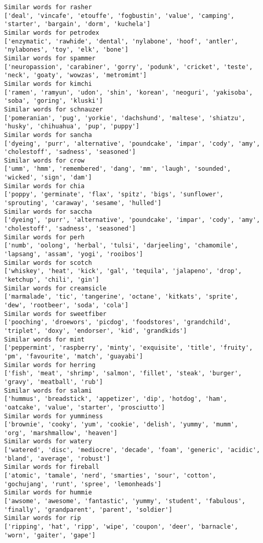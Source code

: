 \documentclass[11pt]{article}
\begin{document}
\begin{Verbatim}[commandchars=\\\{\}]
Similar words for rasher
['deal', 'vincafe', 'etouffe', 'fogbustin', 'value', 'camping', 'starter', 'bargain', 'dorm', 'kuchela']
Similar words for petrodex
['enzymatic', 'rawhide', 'dental', 'nylabone', 'hoof', 'antler', 'nylabones', 'toy', 'elk', 'bone']
Similar words for spammer
['neuropassion', 'carabiner', 'gorry', 'podunk', 'cricket', 'teste', 'neck', 'goaty', 'wowzas', 'metromimt']
Similar words for kimchi
['ramen', 'ramyun', 'udon', 'shin', 'korean', 'neoguri', 'yakisoba', 'soba', 'goring', 'kluski']
Similar words for schnauzer
['pomeranian', 'pug', 'yorkie', 'dachshund', 'maltese', 'shiatzu', 'husky', 'chihuahua', 'pup', 'puppy']
Similar words for sancha
['dyeing', 'purr', 'alternative', 'poundcake', 'impar', 'cody', 'amy', 'cholestoff', 'sadness', 'seasoned']
Similar words for crow
['umm', 'hmm', 'remembered', 'dang', 'mm', 'laugh', 'sounded', 'wicked', 'sign', 'dam']
Similar words for chia
['poppy', 'germinate', 'flax', 'spitz', 'bigs', 'sunflower', 'sprouting', 'caraway', 'sesame', 'hulled']
Similar words for saccha
['dyeing', 'purr', 'alternative', 'poundcake', 'impar', 'cody', 'amy', 'cholestoff', 'sadness', 'seasoned']
Similar words for perh
['numb', 'oolong', 'herbal', 'tulsi', 'darjeeling', 'chamomile', 'lapsang', 'assam', 'yogi', 'rooibos']
Similar words for scotch
['whiskey', 'heat', 'kick', 'gal', 'tequila', 'jalapeno', 'drop', 'ketchup', 'chili', 'gin']
Similar words for creamsicle
['marmalade', 'tic', 'tangerine', 'octane', 'kitkats', 'sprite', 'dew', 'rootbeer', 'soda', 'cola']
Similar words for sweetfiber
['pooching', 'droewors', 'picdog', 'foodstores', 'grandchild', 'triplet', 'doxy', 'endorser', 'kid', 'grandkids']
Similar words for mint
['peppermint', 'raspberry', 'minty', 'exquisite', 'title', 'fruity', 'pm', 'favourite', 'match', 'guayabi']
Similar words for herring
['fish', 'meat', 'shrimp', 'salmon', 'fillet', 'steak', 'burger', 'gravy', 'meatball', 'rub']
Similar words for salami
['hummus', 'breadstick', 'appetizer', 'dip', 'hotdog', 'ham', 'oatcake', 'value', 'starter', 'prosciutto']
Similar words for yumminess
['brownie', 'cooky', 'yum', 'cookie', 'delish', 'yummy', 'mumm', 'org', 'marshmallow', 'heaven']
Similar words for watery
['watered', 'disc', 'mediocre', 'decade', 'foam', 'generic', 'acidic', 'bland', 'average', 'robust']
Similar words for fireball
['atomic', 'tamale', 'nerd', 'smarties', 'sour', 'cotton', 'gochujang', 'runt', 'spree', 'lemonheads']
Similar words for hummie
['awsome', 'awesome', 'fantastic', 'yummy', 'student', 'fabulous', 'finally', 'grandparent', 'parent', 'soldier']
Similar words for rip
['ripping', 'hat', 'ripp', 'wipe', 'coupon', 'deer', 'barnacle', 'worn', 'gaiter', 'gape']

\end{Verbatim}
\end{document}
